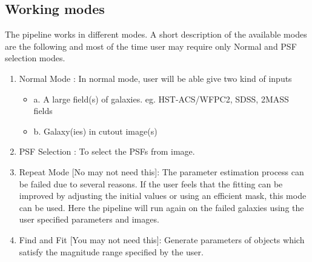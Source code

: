 \documentclass[a4paper,10pt]{article}
\newcommand{\red}[1]{{\color{red}[#1]}}
\begin{document}
\subsection{Working modes}
The pipeline works in different modes. A short description of the available modes are the following and most of the time user may require only Normal and PSF selection modes.
\begin{enumerate}
 \item Normal Mode : In normal mode, user will be able give two kind of inputs
\begin{itemize}
\item 
a. A large field(s) of galaxies. eg. HST-ACS/WFPC2, SDSS, 2MASS fields
\item
b. Galaxy(ies) in cutout image(s)
\end{itemize}

\item PSF Selection : To select the PSFs from image. 

\item Repeat Mode \red{No may not need this}: The parameter estimation process can be failed due to several reasons. If the user feels that the fitting can be improved by adjusting the initial values or using an efficient mask, this mode can be used. Here the pipeline will run again on the failed galaxies using the user specified parameters and images. %

\item Find and Fit \red{You may not need this}: Generate parameters of objects which satisfy the magnitude range specified by the user.


\end{enumerate}
\end{document}
